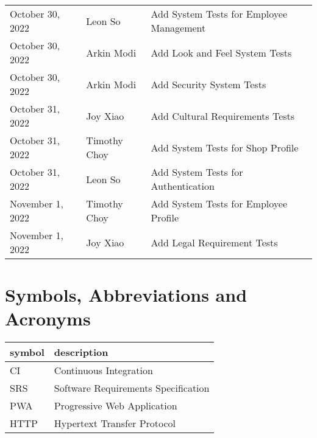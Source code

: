 \documentclass[12pt, titlepage]{article}
\begin{document}
\begin{table}[hp]
\begin{tabularx}{\textwidth}{llX}
		October 30, 2022 & Leon So               & Add System Tests for Employee Management     \\
		October 30, 2022 & Arkin Modi            & Add Look and Feel System Tests               \\
		October 30, 2022 & Arkin Modi            & Add Security System Tests                    \\
		October 31, 2022 & Joy Xiao              & Add Cultural Requirements Tests              \\
		October 31, 2022 & Timothy Choy          & Add System Tests for Shop Profile            \\
		October 31, 2022 & Leon So               & Add System Tests for Authentication          \\
		November 1, 2022 & Timothy Choy          & Add System Tests for Employee Profile        \\
		November 1, 2022 & Joy Xiao              & Add Legal Requirement Tests                  \\
		\bottomrule
	\end{tabularx}
\end{table}

\newpage

\tableofcontents

\listoftables
{}

\listoffigures
{}

\newpage

\section{Symbols, Abbreviations and Acronyms}

\renewcommand{\arraystretch}{1.2}
\begin{tabular}{l l}
	\toprule
	\textbf{symbol} & \textbf{description}                \\
	\midrule
	CI              & Continuous Integration              \\
	SRS             & Software Requirements Specification \\
	PWA             & Progressive Web Application         \\
	HTTP            & Hypertext Transfer Protocol         \\
	\bottomrule
\end{tabular}\\

\newpage
\end{document}
